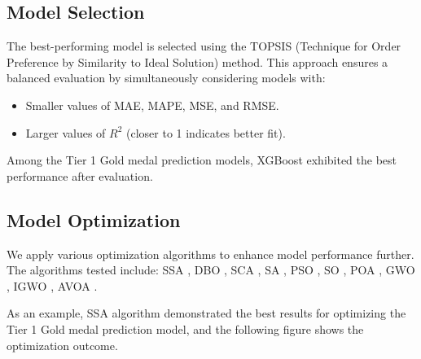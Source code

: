 \documentclass{mcmthesis}
\begin{document}
\subsection{Model Selection}

The best-performing model is selected using the TOPSIS (Technique for Order Preference by Similarity to Ideal Solution) method. This approach ensures a balanced evaluation by simultaneously considering models with:
\begin{itemize}
    \item Smaller values of MAE, MAPE, MSE, and RMSE.
    \item Larger values of $R^2$ (closer to 1 indicates better fit).
\end{itemize}
Among the Tier 1 Gold medal prediction models, XGBoost exhibited the best performance after evaluation.

\subsection{Model Optimization}

We apply various optimization algorithms to enhance model performance further. The algorithms tested include:
SSA \cite{8}, DBO \cite{9}, SCA \cite{10}, SA \cite{11}, PSO \cite{12}, SO \cite{13}, POA \cite{14},  
GWO \cite{15}, IGWO \cite{16}, AVOA \cite{17}.

As an example, SSA algorithm demonstrated the best results for optimizing the Tier 1 Gold medal prediction model, and the following figure shows the optimization outcome.
\end{document}
